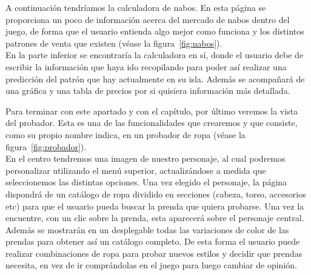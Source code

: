 \clearpage

A continuación tendríamos la calculadora de nabos. En esta página se proporciona un poco de información acerca del mercado de nabos dentro del juego, de forma que el usuario entienda algo mejor como funciona y los distintos patrones de venta que existen {(v\'ease la figura~\ref{fig:nabos})}.\\

En la parte inferior se encontraría la calculadora en sí, donde el usuario debe de escribir la información que haya ido recopilando para poder así realizar una predicción del patrón que hay actualmente en su isla. Además se acompañará de una gráfica y una tabla de precios por si quisiera información más detallada.\\


\clearpage

Para terminar con este apartado y con el capítulo, por último veremos la vista del probador. Esta es una de las funcionalidades que crearemos y que consiste, como su propio nombre indica, en un probador de ropa {(v\'ease la figura~\ref{fig:probador})}.\\

En el centro tendremos una imagen de nuestro personaje, al cual podremos personalizar utilizando el menú superior, actualizándose a medida que seleccionemos las distintas opciones. Una vez elegido el personaje, la página dispondrá de un catálogo de ropa dividido en secciones (cabeza, torso, accesorios etc) para que el usuario pueda buscar la prenda que quiera probarse. Una vez la encuentre, con un clic sobre la prenda, esta aparecerá sobre el personaje central. Además se mostrarán en un desplegable todas las variaciones de color de las prendas para obtener así un catálogo completo. De esta forma el usuario puede realizar combinaciones de ropa para probar nuevos estilos y decidir que prendas necesita, en vez de ir comprándolas en el juego para luego cambiar de opinión.\\

